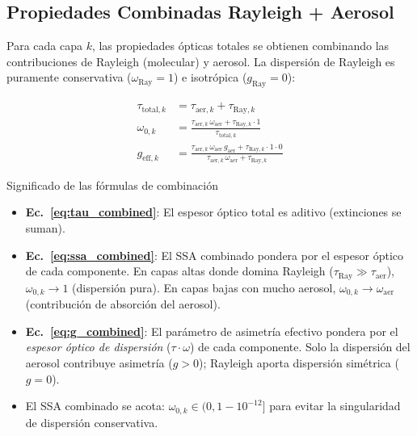 \documentclass[a4paper,11pt]{article}
\begin{document}
\subsection{Propiedades Combinadas Rayleigh + Aerosol}

Para cada capa $k$, las propiedades \'opticas totales se obtienen combinando
las contribuciones de Rayleigh (molecular) y aerosol.  La dispersi\'on de
Rayleigh es puramente conservativa ($\omega_{\text{Ray}} = 1$) e isotr\'opica
($g_{\text{Ray}} = 0$):

\begin{align}
    \tau_{\text{total},k} &= \tau_{\text{aer},k} + \tau_{\text{Ray},k}
    \label{eq:tau_combined}\\
    \omega_{0,k} &= \frac{\tau_{\text{aer},k}\,\omega_{\text{aer}}
    + \tau_{\text{Ray},k}\cdot 1}{\tau_{\text{total},k}}
    \label{eq:ssa_combined}\\
    g_{\text{eff},k} &= \frac{\tau_{\text{aer},k}\,\omega_{\text{aer}}\,g_{\text{aer}}
    + \tau_{\text{Ray},k}\cdot 1 \cdot 0}
    {\tau_{\text{aer},k}\,\omega_{\text{aer}} + \tau_{\text{Ray},k}}
    \label{eq:g_combined}
\end{align}

\begin{physics}{Significado de las f\'ormulas de combinaci\'on}
\begin{itemize}
    \item \textbf{Ec.~\eqref{eq:tau_combined}}: El espesor \'optico total es
          aditivo (extinciones se suman).
    \item \textbf{Ec.~\eqref{eq:ssa_combined}}: El SSA combinado pondera por
          el espesor \'optico de cada componente.  En capas altas donde domina
          Rayleigh ($\tau_{\text{Ray}} \gg \tau_{\text{aer}}$),
          $\omega_{0,k} \to 1$ (dispersi\'on pura).  En capas bajas con mucho
          aerosol, $\omega_{0,k} \to \omega_{\text{aer}}$ (contribuci\'on de
          absorci\'on del aerosol).
    \item \textbf{Ec.~\eqref{eq:g_combined}}: El par\'ametro de asimetr\'ia
          efectivo pondera por el \emph{espesor \'optico de dispersi\'on}
          ($\tau \cdot \omega$) de cada componente.  Solo la dispersi\'on
          del aerosol contribuye asimetr\'ia ($g > 0$); Rayleigh aporta
          dispersi\'on sim\'etrica ($g = 0$).
    \item El SSA combinado se acota: $\omega_{0,k} \in (0, 1-10^{-12}]$ para
          evitar la singularidad de dispersi\'on conservativa.
\end{itemize}
\end{physics}
\end{document}
